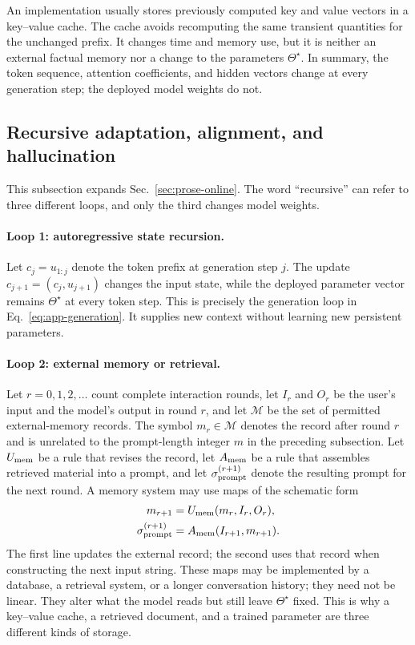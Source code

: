 \documentclass[
  aps,
  reprint,
  superscriptaddress,
  floatfix,
  nofootinbib,
  longbibliography
]{revtex4-2}
\begin{document}
An implementation usually stores previously computed key and value vectors in
a key--value cache.  The cache avoids recomputing the same transient quantities
for the unchanged prefix.  It changes time and memory use, but it is neither an
external factual memory nor a change to the parameters $\Theta^\star$.  In
summary, the token sequence, attention coefficients, and hidden vectors change
at every generation step; the deployed model weights do not.

\subsection{Recursive adaptation, alignment, and hallucination}
\label{app:online}

This subsection expands Sec.~\ref{sec:prose-online}.  The word ``recursive'' can
refer to three different loops, and only the third changes model weights.

\paragraph{Loop 1: autoregressive state recursion.}
Let $c_j=u_{1:j}$ denote the token prefix at generation step $j$.  The update
$c_{j+1}=(c_j,u_{j+1})$ changes the input state, while the deployed parameter
vector remains $\Theta^\star$ at every token step.  This is precisely the
generation loop in Eq.~\eqref{eq:app-generation}.  It supplies new context
without learning new persistent parameters.

\paragraph{Loop 2: external memory or retrieval.}
Let $r=0,1,2,\ldots$ count complete interaction rounds, let $I_r$ and $O_r$ be
the user's input and the model's output in round $r$, and let $\mathcal M$ be
the set of permitted external-memory records.  The symbol $m_r\in\mathcal M$
denotes the record after round $r$ and is unrelated to the prompt-length integer
$m$ in the preceding subsection.  Let $U_{\rm mem}$ be a rule that revises the
record, let $A_{\rm mem}$ be a rule that assembles retrieved material into a
prompt, and let $\sigma_{\rm prompt}^{(r+1)}$ denote the resulting prompt for
the next round.  A memory system may use maps of the schematic form
\begin{equation}
\label{eq:app-memory-update}
\begin{aligned}
m_{r+1}&=U_{\rm mem}(m_r,I_r,O_r),\\
\sigma_{\rm prompt}^{(r+1)}
&=A_{\rm mem}(I_{r+1},m_{r+1}).
\end{aligned}
\end{equation}
The first line updates the external record; the second uses that record when
constructing the next input string.  These maps may be implemented by a
database, a retrieval system, or a longer conversation history; they need not
be linear.  They alter what the model reads but still leave $\Theta^\star$
fixed.  This is why a key--value cache, a retrieved document, and a trained
parameter are three different kinds of storage.
\end{document}
